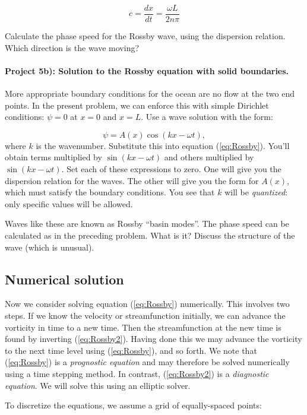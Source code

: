\documentclass[%
oneside,                 %
final,                   %
10pt]{article}
\begin{document}
\begin{equation}
	c = \frac{dx}{dt} = \frac{\omega L}{2n\pi}
\end{equation}

Calculate the phase speed for the Rossby wave, using the dispersion relation. Which direction is the wave moving?


\paragraph{Project 5b): Solution to the Rossby equation with solid boundaries.}
More appropriate boundary conditions for the ocean are no flow at the
two end points. In the present problem, we can enforce this with
simple Dirichlet conditions: $\psi=0$ at $x=0$ and $x=L$. Use
a wave solution with the form:

\begin{equation}
	\psi = A(x)\cos{(kx - \omega t)}, 
\end{equation}
where $k$ is the wavenumber. Substitute this into equation
(\ref{eq:Rossby}). You'll obtain terms multiplied by $\sin{(kx - \omega
t)}$ and others multiplied by $\sin{(kx - \omega t)}$. Set each of these
expressions to zero. One will give you the dispersion relation for the
waves. The other will give you the form for $A(x)$, which must satisfy
the boundary conditions. You see that $k$ will be \emph{quantized}:
only specific values will be allowed.

Waves like these are known as Rossby ``basin modes''. The phase speed
can be calculated as in the preceding problem. What is it? Discuss the
structure of the wave (which is unusual).


\subsection*{Numerical solution}
Now we consider solving equation (\ref{eq:Rossby}) numerically. This
involves two steps. If we know the velocity or streamfunction
initially, we can advance the vorticity in time to a new time. Then
the streamfunction at the new time is found by inverting
(\ref{eq:Rossby2}). Having done this we may advance the vorticity to
the next time level using (\ref{eq:Rossby}), and so forth. We note
that (\ref{eq:Rossby}) is a \emph{prognostic equation} and may
therefore be solved numerically using a time stepping method. In
contrast, (\ref{eq:Rossby2}) is a \emph{diagnostic equation}. We will
solve this using an elliptic solver.

To discretize the equations, we assume a grid of equally-spaced
points:
\end{document}
